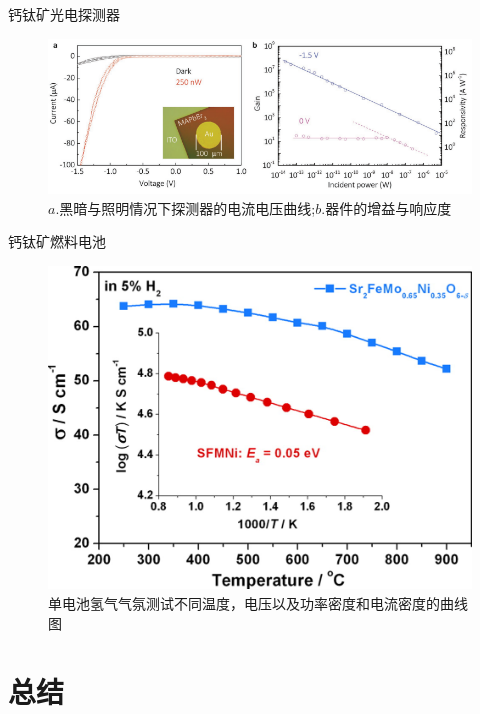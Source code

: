 \documentclass{beamer}[fontset=windows]
\begin{document}
\begin{frame}{钙钛矿光电探测器}
	\begin{figure}[H]
		\centering
		\hspace{2em}\includegraphics[width=1.0\linewidth]{pic/9.png}
		\caption{$a.$黑暗与照明情况下探测器的电流电压曲线;$b.$器件的增益与响应度\cite{yang2018high}
		}
	\end{figure}
\end{frame}
\begin{frame}{钙钛矿燃料电池}
	\begin{figure}[H]
		\centering
		\hspace{2em}\includegraphics[width=.7\linewidth]{pic/1.jpeg}
		\caption{单电池氢气气氛测试不同温度，电压以及功率密度和电流密度的曲线图\cite{du2016high}
		}
	\end{figure}
\end{frame}
\section{总结}
\end{document}
